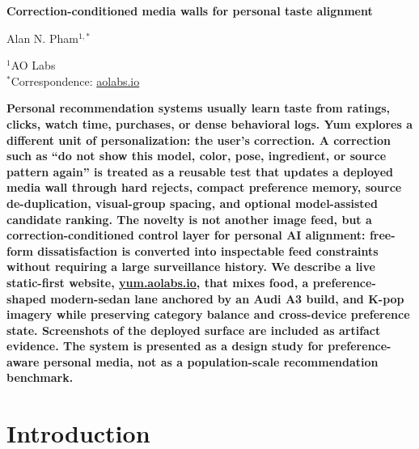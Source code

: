 \documentclass[12pt,letterpaper]{article}
\begin{document}
\linenumbers
\thispagestyle{empty}

\begin{center}
    \vspace*{-0.6em}

    {\fontsize{20}{22}\selectfont\bfseries\color{SumiInk}
    Correction-conditioned media walls for personal taste alignment\par}

    \vspace{0.95em}

    {\normalsize\color{SumiInk}
    Alan N. Pham$^{1,*}$\par}

    \vspace{0.38em}

    {\small\color{DustyTaupe}
    $^{1}$AO Labs\\
    $^{*}$Correspondence: \href{https://aolabs.io}{aolabs.io}\par}
\end{center}

\vspace{0.35em}
\noindent\textbf{Personal recommendation systems usually learn taste from ratings, clicks, watch time, purchases, or dense behavioral logs. Yum explores a different unit of personalization: the user's correction. A correction such as ``do not show this model, color, pose, ingredient, or source pattern again'' is treated as a reusable test that updates a deployed media wall through hard rejects, compact preference memory, source de-duplication, visual-group spacing, and optional model-assisted candidate ranking. The novelty is not another image feed, but a correction-conditioned control layer for personal AI alignment: free-form dissatisfaction is converted into inspectable feed constraints without requiring a large surveillance history. We describe a live static-first website, \href{https://yum.aolabs.io}{yum.aolabs.io}, that mixes food, a preference-shaped modern-sedan lane anchored by an Audi A3 build, and K-pop imagery while preserving category balance and cross-device preference state. Screenshots of the deployed surface are included as artifact evidence. The system is presented as a design study for preference-aware personal media, not as a population-scale recommendation benchmark.}

\newpage
\pagestyle{fancy}

\section{Introduction}
\end{document}
